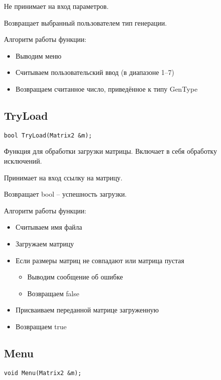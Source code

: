 Не принимает на вход параметров.

Возвращает выбранный пользователем тип генерации.

Алгоритм работы функции:

\begin{itemize}
	\item Выводим меню
	\item Считываем пользовательский ввод (в диапазоне 1--7)
	\item Возвращаем считанное число, приведённое к типу GenType
\end{itemize}

\subsection*{TryLoad}

\begin{lstlisting}[label={lst:TryLoad}]
	bool TryLoad(Matrix2 &m);
\end{lstlisting}

Функция для обработки загрузки матрицы.
Включает в себя обработку исключений.

Принимает на вход ссылку на матрицу.

Возвращает bool -- успешность загрузки.

Алгоритм работы функции:

\begin{itemize}
	\item Считываем имя файла
	\item Загружаем матрицу
	\item Если размеры матриц не совпадают или матрица пустая
	\begin{itemize}
		\item Выводим сообщение об ошибке
		\item Возвращаем false
	\end{itemize}
	\item Присваиваем переданной матрице загруженную
	\item Возвращаем true
\end{itemize}

\subsection*{Menu}

\begin{lstlisting}[label={lst:Menu}]
	void Menu(Matrix2 &m);
\end{lstlisting}

